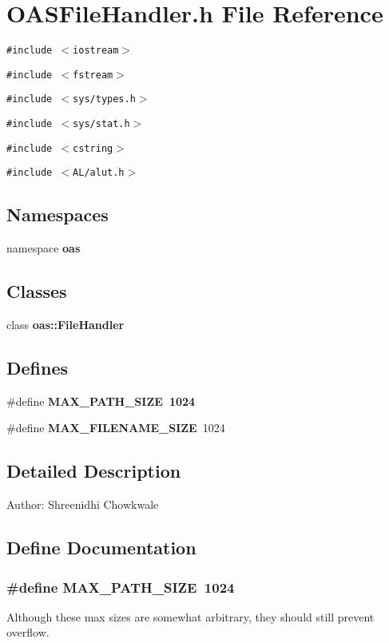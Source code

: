 \section{OASFile\-Handler.h File Reference}
\label{OASFileHandler_8h}
{\tt \#include $<$iostream$>$}\par
{\tt \#include $<$fstream$>$}\par
{\tt \#include $<$sys/types.h$>$}\par
{\tt \#include $<$sys/stat.h$>$}\par
{\tt \#include $<$cstring$>$}\par
{\tt \#include $<$AL/alut.h$>$}\par
\subsection*{Namespaces}
\begin{CompactItemize}
\item 
namespace \textbf{oas}
\end{CompactItemize}
\subsection*{Classes}
\begin{CompactItemize}
\item 
class \bf{oas::File\-Handler}
\end{CompactItemize}
\subsection*{Defines}
\begin{CompactItemize}
\item 
\#define \bf{MAX\_\-PATH\_\-SIZE}~1024
\item 
\#define \textbf{MAX\_\-FILENAME\_\-SIZE}~1024\label{OASFileHandler_8h_c251a6b1381513f30391079c1f808313}

\end{CompactItemize}


\subsection{Detailed Description}
\begin{Desc}
\item[Author:]Shreenidhi Chowkwale \end{Desc}


\subsection{Define Documentation}
\subsubsection{\setlength{\rightskip}{0pt plus 5cm}\#define MAX\_\-PATH\_\-SIZE~1024}\label{OASFileHandler_8h_f40eab901e7e6bd5f71a5e8ea9fd5799}


Although these max sizes are somewhat arbitrary, they should still prevent overflow. 